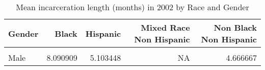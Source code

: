 \begin{table}[H]

\caption{\label{tab:tab:summarystats}Mean incarceration length (months) in 2002 by Race and Gender}
\centering
\begin{tabular}[t]{lrrrr}
\toprule
Gender & Black & Hispanic & Mixed Race Non Hispanic & Non Black Non Hispanic\\
\midrule
\cellcolor{gray!6}{Female} & \cellcolor{gray!6}{2.666667} & \cellcolor{gray!6}{4.500000} & \cellcolor{gray!6}{6} & \cellcolor{gray!6}{3.230769}\\
Male & 8.090909 & 5.103448 & NA & 4.666667\\
\bottomrule
\end{tabular}
\end{table}
